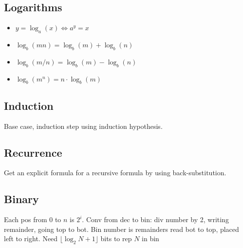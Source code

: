 \subsection{Logarithms}
\begin{itemize}
	\item $y=\log_a{(x)}\iff a^y=x$
	\item $\log_b{(mn)}=\log_b{(m)}+\log_b{(n)}$
	\item $\log_b{(m/n)}=\log_b{(m)}-\log_b{(n)}$
	\item $\log_b{(m^n)}=n \cdot \log_b{(m)}$
\end{itemize}
\subsection{Induction} Base case, induction step using induction hypothesis.
\subsection{Recurrence} Get an explicit formula for a recursive formula by using back-substitution.
\subsection{Binary} Each pos from $0$ to $n$ is $2^i$. Conv from dec to bin: div number by 2, writing remainder, going top to bot. Bin number is remainders read bot to top, placed left to right. Need $\lfloor \log_2{N}+1 \rfloor$ bits to rep $N$ in bin

